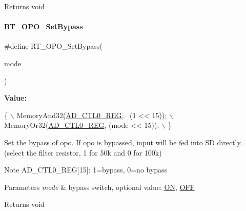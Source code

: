 \begin{DoxyReturn}{Returns}
void 
\end{DoxyReturn}
\mbox{\label{a00002_a3297280ab870eae12b918351e111819a}} 
\paragraph{\texorpdfstring{R\+T\+\_\+\+O\+P\+O\+\_\+\+Set\+Bypass}{RT\_OPO\_SetBypass}}
{\footnotesize\ttfamily \#define R\+T\+\_\+\+O\+P\+O\+\_\+\+Set\+Bypass(\begin{DoxyParamCaption}\item[{}]{mode }\end{DoxyParamCaption})}

{\bfseries Value\+:}
\begin{DoxyCode}
\{                                           \(\backslash\)
        MemoryAnd32(\mbox{\hyperlink{a00020_a7c90725a1b307a000a44211bcb115a47}{AD\_CTL0\_REG}}, ~(1 << 15));   \(\backslash\)
        MemoryOr32(\mbox{\hyperlink{a00020_a7c90725a1b307a000a44211bcb115a47}{AD\_CTL0\_REG}}, (mode << 15));  \(\backslash\)
    \}
\end{DoxyCode}


Set the bypass of opo. If opo is bypassed, input will be fed into SD directly. (select the filter resistor, 1 for 50k and 0 for 100k) 

\begin{DoxyNote}{Note}
A\+D\+\_\+\+C\+T\+L0\+\_\+\+R\+EG\mbox{[}15\mbox{]}\+: 1=bypass, 0=no bypass 
\end{DoxyNote}

\begin{DoxyParams}{Parameters}
{\em mode} & bypass switch, optional value\+: \mbox{\hyperlink{a00020_ad76d1750a6cdeebd506bfcd6752554d2}{ON}}, \mbox{\hyperlink{a00020_a29e413f6725b2ba32d165ffaa35b01e5}{O\+FF}} \\
\hline
\end{DoxyParams}
\begin{DoxyReturn}{Returns}
void 
\end{DoxyReturn}
\mbox{\label{a00002_a5867d7cb8e45d61e08c23747ad488ff8}} 
